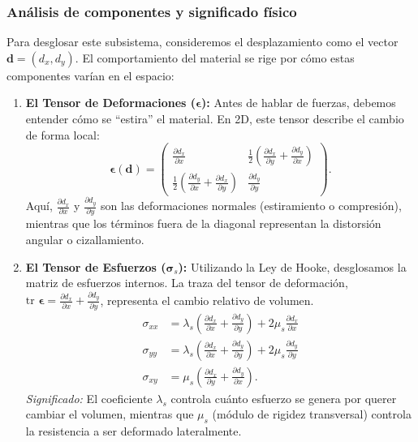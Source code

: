 \documentclass[12pt, letterpaper]{report}
\theoremstyle{definition}
\begin{document}
\subsubsection{Análisis de componentes y significado físico}

Para desglosar este subsistema, consideremos el desplazamiento como el vector $\mathbf{d} = (d_x, d_y)$. El comportamiento del material se rige por cómo estas componentes varían en el espacio:

\begin{enumerate}
    \item \textbf{El Tensor de Deformaciones ($\boldsymbol{\epsilon}$):} Antes de hablar de fuerzas, debemos entender cómo se ``estira'' el material. En 2D, este tensor describe el cambio de forma local:
    \begin{equation}
        \boldsymbol{\epsilon}(\mathbf{d}) = \begin{pmatrix} 
            \frac{\partial d_x}{\partial x} & \frac{1}{2}\left( \frac{\partial d_x}{\partial y} + \frac{\partial d_y}{\partial x} \right) \\ 
            \frac{1}{2}\left( \frac{\partial d_y}{\partial x} + \frac{\partial d_x}{\partial y} \right) & \frac{\partial d_y}{\partial y} 
        \end{pmatrix}.
    \end{equation}
    Aquí, $\frac{\partial d_x}{\partial x}$ y $\frac{\partial d_y}{\partial y}$ son las deformaciones normales (estiramiento o compresión), mientras que los términos fuera de la diagonal representan la distorsión angular o cizallamiento.
    
    \item \textbf{El Tensor de Esfuerzos ($\boldsymbol{\sigma}_s$):} Utilizando la Ley de Hooke, desglosamos la matriz de esfuerzos internos. La traza del tensor de deformación, \\ $\text{tr } \boldsymbol{\epsilon} = \frac{\partial d_x}{\partial x} + \frac{\partial d_y}{\partial y}$, representa el cambio relativo de volumen.
    \begin{align}
        \sigma_{xx} &= \lambda_s \left( \frac{\partial d_x}{\partial x} + \frac{\partial d_y}{\partial y} \right) + 2\mu_s \frac{\partial d_x}{\partial x} \\
        \sigma_{yy} &= \lambda_s \left( \frac{\partial d_x}{\partial x} + \frac{\partial d_y}{\partial y} \right) + 2\mu_s \frac{\partial d_y}{\partial y} \\
        \sigma_{xy} &= \mu_s \left( \frac{\partial d_x}{\partial y} + \frac{\partial d_y}{\partial x} \right).
    \end{align}
    \textit{Significado:} El coeficiente $\lambda_s$ controla cuánto esfuerzo se genera por querer cambiar el volumen, mientras que $\mu_s$ (módulo de rigidez transversal) controla la resistencia a ser deformado lateralmente.
    

\end{enumerate}
\end{document}
